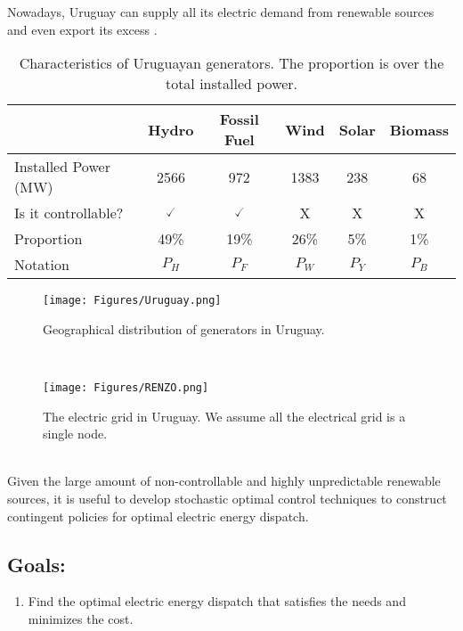 \documentclass[ima, 20pt, portrait, plainboxedsections]{sciposter}
\begin{document}
\begin{multicols}{3}
Nowadays, Uruguay can supply all its electric demand from renewable sources and even export its excess \cite{Risso}.
\begin{center}
\begin{minipage}{0.26\textwidth}
\begin{table}
\begin{tabular}{|l|ccccc|}
 \toprule
 & Hydro & Fossil Fuel & Wind & Solar & Biomass \\
 \midrule
Installed Power (MW) & 2566 & 972 & 1383 & 238 & 68 \\
Is it controllable? & $\checked$ & $\checked$ & X & X & X \\
Proportion & 49\% & 19\% & 26\% & 5\% & 1\% \\
Notation & $P_H$ & $P_F$ & $P_W$ & $P_Y$ & $P_B$ \\
\bottomrule
\end{tabular}
\caption{Characteristics of Uruguayan generators. The proportion is over the total installed power.}
\end{table}
\end{minipage}
\end{center} 
\begin{figure}[ht!]
\centering
\texttt{[image: Figures/Uruguay.png]}
\caption{Geographical distribution of generators in Uruguay.}
\label{Map_Uy}
\end{figure}\\
\begin{figure}[ht!]
\centering
\texttt{[image: Figures/RENZO.png]}
\caption{The electric grid in Uruguay. We assume all the electrical grid is a single node.}
\label{Grid_Uy}
\end{figure}\\
Given the large amount of non-controllable and highly unpredictable renewable sources, it is useful to develop stochastic optimal control techniques to construct contingent policies for optimal electric energy dispatch.\\

\subsection*{{\color{red}Goals:}}

\begin{enumerate}

\item[{\color{red}(1)}] Find the optimal electric energy dispatch that satisfies the needs and minimizes the cost.


\end{enumerate}
\end{multicols}
\end{document}
